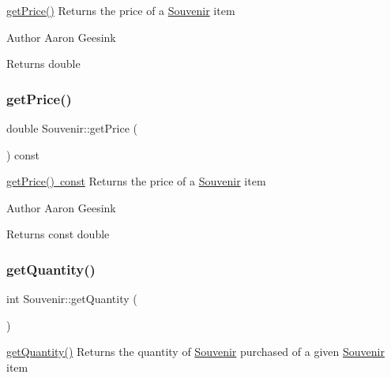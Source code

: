 \mbox{\hyperlink{class_souvenir_a1cb4a0a435a8343fb4a6519e534e6a69}{get\+Price()}} Returns the price of a \mbox{\hyperlink{class_souvenir}{Souvenir}} item 

\begin{DoxyAuthor}{Author}
Aaron Geesink 
\end{DoxyAuthor}
\begin{DoxyReturn}{Returns}
double 
\end{DoxyReturn}
\mbox{\label{class_souvenir_aa3dfe5b64bfc5e3785cefd90759e281f}} 
\subsubsection{\texorpdfstring{getPrice()}{getPrice()}\hspace{0.1cm}{\footnotesize\ttfamily [2/2]}}
{\footnotesize\ttfamily double Souvenir\+::get\+Price (\begin{DoxyParamCaption}{ }\end{DoxyParamCaption}) const}



\mbox{\hyperlink{class_souvenir_aa3dfe5b64bfc5e3785cefd90759e281f}{get\+Price() const}} Returns the price of a \mbox{\hyperlink{class_souvenir}{Souvenir}} item 

\begin{DoxyAuthor}{Author}
Aaron Geesink 
\end{DoxyAuthor}
\begin{DoxyReturn}{Returns}
const double 
\end{DoxyReturn}
\mbox{\label{class_souvenir_ae539983b43f9d26125f54da500f3b5de}} 
\subsubsection{\texorpdfstring{getQuantity()}{getQuantity()}}
{\footnotesize\ttfamily int Souvenir\+::get\+Quantity (\begin{DoxyParamCaption}{ }\end{DoxyParamCaption})}



\mbox{\hyperlink{class_souvenir_ae539983b43f9d26125f54da500f3b5de}{get\+Quantity()}} Returns the quantity of \mbox{\hyperlink{class_souvenir}{Souvenir}} purchased of a given \mbox{\hyperlink{class_souvenir}{Souvenir}} item 

